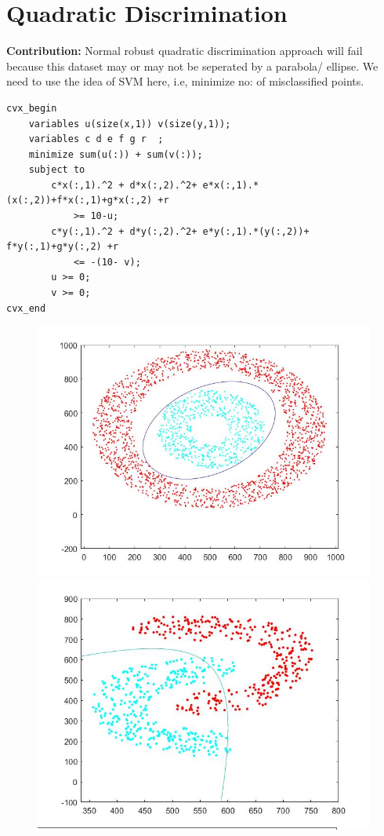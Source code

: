 \documentclass{article}
\begin{document}
\section{Quadratic Discrimination}
\textbf{Contribution:} Normal robust quadratic discrimination approach will fail because this dataset may or may not be seperated by a parabola/ ellipse. We need to use the idea of SVM here, i.e, minimize no: of misclassified points.
\begin{verbatim}
cvx_begin
    variables u(size(x,1)) v(size(y,1));
    variables c d e f g r  ;
    minimize sum(u(:)) + sum(v(:));
    subject to
        c*x(:,1).^2 + d*x(:,2).^2+ e*x(:,1).*(x(:,2))+f*x(:,1)+g*x(:,2) +r 
            >= 10-u;
        c*y(:,1).^2 + d*y(:,2).^2+ e*y(:,1).*(y(:,2))+ f*y(:,1)+g*y(:,2) +r 
            <= -(10- v);
        u >= 0;
        v >= 0;
cvx_end
\end{verbatim}
\begin{figure}[h!]
    \centering
    \begin{minipage}{0.45\textwidth}
        \centering
        \includegraphics[width=\textwidth]{data4.jpg} %
    \end{minipage}\hfill
    \begin{minipage}{0.45\textwidth}
        \centering
        \includegraphics[width=\textwidth]{data3.jpg} %
    \end{minipage}
\end{figure}
\end{document}
